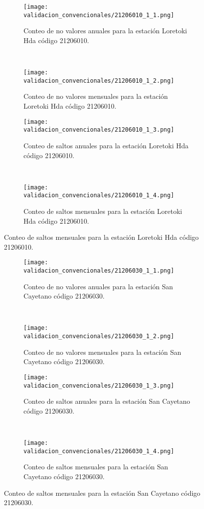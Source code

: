 \begin{figure}[H]\ContinuedFloat
\centering
	\begin{subfigure}[normla]{0.4\textwidth}
	\texttt{[image: validacion\_convencionales/21206010\_1\_1.png]}
		\caption{Conteo de no valores anuales para la estación Loretoki Hda código 21206010.}
		\label{subfig:a1}
		\end{subfigure}
		~
    \begin{subfigure}[normla]{0.4\textwidth}
	\texttt{[image: validacion\_convencionales/21206010\_1\_2.png]}
		\caption{Conteo de no valores mensuales para la estación Loretoki Hda código 21206010.}
		\label{subfig:a2}
		\end{subfigure}
		
    \begin{subfigure}[normla]{0.4\textwidth}
	\texttt{[image: validacion\_convencionales/21206010\_1\_3.png]}
		\caption{Conteo de saltos anuales para la estación Loretoki Hda código 21206010.}
		\label{subfig:a1}
		\end{subfigure}
		~
    \begin{subfigure}[normla]{0.4\textwidth}
	\texttt{[image: validacion\_convencionales/21206010\_1\_4.png]}
		\caption{Conteo de saltos mensuales para la estación Loretoki Hda código 21206010.}
		\label{subfig:a2}
		\end{subfigure}

	
\end{figure}
           
\begin{figure}[H]\ContinuedFloat
\centering
	\begin{subfigure}[normla]{0.4\textwidth}
	\texttt{[image: validacion\_convencionales/21206030\_1\_1.png]}
		\caption{Conteo de no valores anuales para la estación San Cayetano código 21206030.}
		\label{subfig:a1}
		\end{subfigure}
		~
    \begin{subfigure}[normla]{0.4\textwidth}
	\texttt{[image: validacion\_convencionales/21206030\_1\_2.png]}
		\caption{Conteo de no valores mensuales para la estación San Cayetano código 21206030.}
		\label{subfig:a2}
		\end{subfigure}
		
    \begin{subfigure}[normla]{0.4\textwidth}
	\texttt{[image: validacion\_convencionales/21206030\_1\_3.png]}
		\caption{Conteo de saltos anuales para la estación San Cayetano código 21206030.}
		\label{subfig:a1}
		\end{subfigure}
		~
    \begin{subfigure}[normla]{0.4\textwidth}
	\texttt{[image: validacion\_convencionales/21206030\_1\_4.png]}
		\caption{Conteo de saltos mensuales para la estación San Cayetano código 21206030.}
		\label{subfig:a2}
		\end{subfigure}

	
\end{figure}
           
